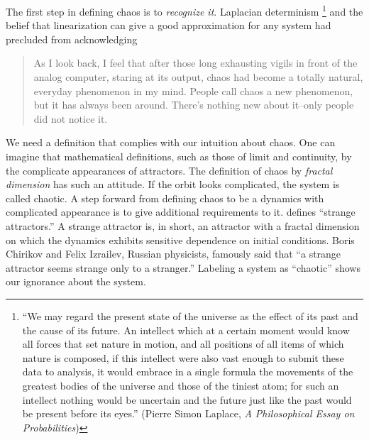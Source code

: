 \documentclass[10pt,twoside,draft]{book}
\begin{document}
The first step in defining chaos is to \textit{recognize it}.
Laplacian determinism 
\footnote{``We may regard the present state of the universe as the effect of its past and the cause of its future. An intellect which at a certain moment would know all forces that set nature in motion, and all positions of all items of which nature is composed, if this intellect were also vast enough to submit these data to analysis, it would embrace in a single formula the movements of the greatest bodies of the universe and those of the tiniest atom; for such an intellect nothing would be uncertain and the future just like the past would be present before its eyes.''
  (Pierre Simon Laplace, \textit{A Philosophical Essay on Probabilities})}
\citep{stone} and the belief that linearization can give a good approximation for any system had precluded from acknowledging

\begin{quotation}
As I look back, I feel that after those long exhausting vigils in front of the analog computer, staring at its output, chaos had become a totally natural, everyday phenomenon in my mind.
People call chaos a new phenomenon, but it has always been around.
There's nothing new about it--only people did not notice it.
\citep[p.27]{ueda-abraham}
\end{quotation}


We need a definition that complies with our intuition about chaos.
One can imagine that mathematical definitions, such as those of limit and continuity,
by the complicate appearances of attractors.
The definition of chaos by \textit{fractal dimension} has such an attitude.
If the orbit looks complicated, the system is called chaotic.
A step forward from defining chaos to be a dynamics with complicated appearance is to give additional requirements to it.
\citet{ruelle} defines ``strange attractors.'' 
A strange attractor is, in short, an attractor with a fractal dimension on which the dynamics exhibits sensitive dependence on initial conditions. \citep[p.11]{ott1994}
Boris Chirikov and Felix Izrailev, Russian physicists, famously said that ``a strange attractor seems strange only to a stranger.'' \citep{lorentzbook}
Labeling a system as ``chaotic'' shows our ignorance about the system.
\end{document}
